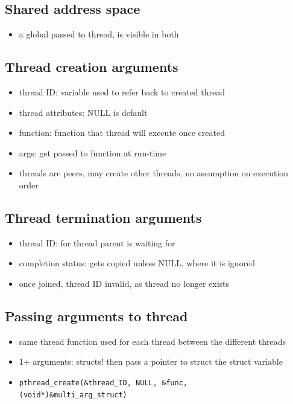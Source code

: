 \documentclass[10pt, multicolumn, a4paper]{article}
\begin{document}
\begin{multicols}{2}
	\subsection*{Shared address space}
	\begin{itemize}
	\item a global passed to thread, is visible in both
	\end{itemize}
	\subsection*{Thread creation arguments}
	\begin{itemize}
	\item thread ID: variable used to refer back to created thread
	\item thread attributes: NULL is default
	\item function: function that thread will execute once created
	\item args: get passed to function at run-time
	\item threads are peers, may create other threads, no assumption on execution order
	\end{itemize}
	\subsection*{Thread termination arguments}
	\begin{itemize}
	\item thread ID: for thread parent is waiting for
	\item completion status: gets copied unless NULL, where it is ignored
	\item once joined, thread ID invalid, as thread no longer exists
	\end{itemize}
	\subsection*{Passing arguments to thread}
	\begin{itemize}
	\item same thread function used for each thread between the different threads
	\item 1+ arguments: structs! then pass a pointer to struct the struct variable
	\item \verb|pthread_create(&thread_ID, NULL, &func,| \\ \verb|(void*)&multi_arg_struct)|
	\end{itemize}

\end{multicols}
\end{document}
